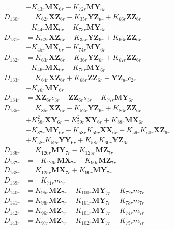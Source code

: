 \begin{multicols}{2}
\begin{align}
&- K_{43r}\mathbf{MX}_{6r} - K_{72r}\mathbf{MY}_{6r} \nonumber \\
D_{130r} &= K_{62r}\mathbf{XZ}_{6r} - K_{35r}\mathbf{YZ}_{6r} + K_{66r}\mathbf{ZZ}_{6r}  \nonumber \\
&- K_{44r}\mathbf{MX}_{6r} - K_{73r}\mathbf{MY}_{6r} \nonumber \\
D_{131r} &= K_{62r}\mathbf{XZ}_{6r} - K_{35r}\mathbf{YZ}_{6r} + K_{66r}\mathbf{ZZ}_{6r}  \nonumber \\
&- K_{45r}\mathbf{MX}_{6r} - K_{74r}\mathbf{MY}_{6r} \nonumber \\
D_{132r} &= K_{63r}\mathbf{XZ}_{6r} - K_{36r}\mathbf{YZ}_{6r} + K_{67r}\mathbf{ZZ}_{6r}  \nonumber \\
&- K_{46r}\mathbf{MX}_{6r} - K_{75r}\mathbf{MY}_{6r} \nonumber \\
D_{133r} &= K_{64r}\mathbf{XZ}_{6r} + K_{68r}\mathbf{ZZ}_{6r} - \mathbf{YZ}_{6r}c_{2r}  \nonumber \\
&- K_{76r}\mathbf{MY}_{6r} \nonumber \\
D_{134r} &= \mathbf{XZ}_{6r}c_{3r} - \mathbf{ZZ}_{6r}s_{3r} - K_{77r}\mathbf{MY}_{6r} \nonumber \\
D_{135r} &= K_{85r}\mathbf{XZ}_{6r} - K_{52r}\mathbf{YZ}_{6r} + K_{86r}\mathbf{ZZ}_{6r}  \nonumber \\
&+ K_{58r}^2\mathbf{XY}_{6r} - K_{59r}^2\mathbf{XY}_{6r} + K_{88r}\mathbf{MX}_{6r}  \nonumber \\
&- K_{87r}\mathbf{MY}_{6r} - K_{58r}K_{59r}\mathbf{XX}_{6r} - K_{59r}K_{60r}\mathbf{XZ}_{6r}  \nonumber \\
&+ K_{58r}K_{59r}\mathbf{YY}_{6r} + K_{58r}K_{60r}\mathbf{YZ}_{6r} \nonumber \\
D_{136r} &= K_{126r}\mathbf{MY}_{7r} - K_{125r}\mathbf{MZ}_{7r} \nonumber \\
D_{137r} &= - K_{126r}\mathbf{MX}_{7r} - K_{90r}\mathbf{MZ}_{7r} \nonumber \\
D_{138r} &= K_{125r}\mathbf{MX}_{7r} + K_{90r}\mathbf{MY}_{7r} \nonumber \\
D_{139r} &= -K_{71r}m_{7r} \nonumber \\
D_{140r} &= K_{95r}\mathbf{MZ}_{7r} - K_{100r}\mathbf{MY}_{7r} - K_{72r}m_{7r} \nonumber \\
D_{141r} &= K_{96r}\mathbf{MZ}_{7r} - K_{101r}\mathbf{MY}_{7r} - K_{73r}m_{7r} \nonumber \\
D_{142r} &= K_{96r}\mathbf{MZ}_{7r} - K_{101r}\mathbf{MY}_{7r} - K_{74r}m_{7r} \nonumber \\
D_{143r} &= K_{97r}\mathbf{MZ}_{7r} - K_{102r}\mathbf{MY}_{7r} - K_{75r}m_{7r} \nonumber \\

\end{align}
\end{multicols}
